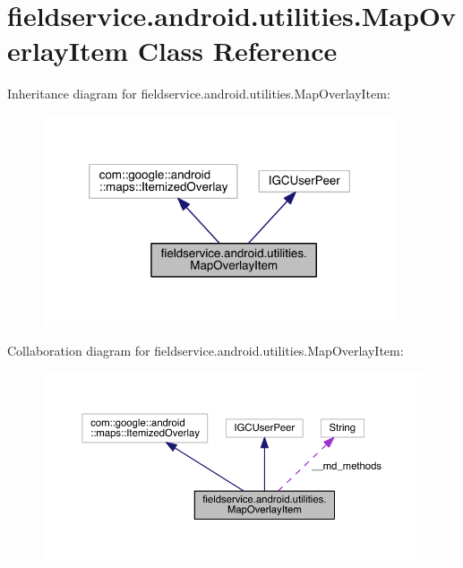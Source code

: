 \hypertarget{classfieldservice_1_1android_1_1utilities_1_1_map_overlay_item}{\section{fieldservice.\+android.\+utilities.\+Map\+Overlay\+Item Class Reference}
\label{classfieldservice_1_1android_1_1utilities_1_1_map_overlay_item}
}


Inheritance diagram for fieldservice.\+android.\+utilities.\+Map\+Overlay\+Item\+:
\nopagebreak
\begin{figure}[H]
\begin{center}
\leavevmode
\includegraphics[width=297pt]{classfieldservice_1_1android_1_1utilities_1_1_map_overlay_item__inherit__graph}
\end{center}
\end{figure}


Collaboration diagram for fieldservice.\+android.\+utilities.\+Map\+Overlay\+Item\+:
\nopagebreak
\begin{figure}[H]
\begin{center}
\leavevmode
\includegraphics[width=350pt]{classfieldservice_1_1android_1_1utilities_1_1_map_overlay_item__coll__graph}
\end{center}
\end{figure}
